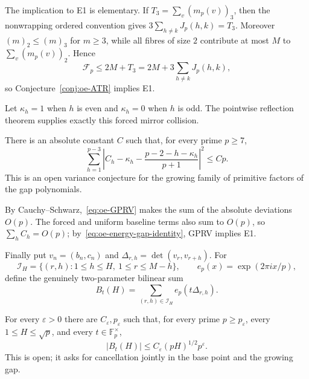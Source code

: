 The implication to E1 is elementary.  If
$T_3=\sum_v(m_p(v))_3$, then the nonwrapping ordered convention gives
$3\sum_{h\ne k}J_p(h,k)=T_3$.  Moreover
$(m)_2\le(m)_3$ for $m\ge3$, while all fibres of size $2$ contribute at
most $M$ to $\sum_v(m_p(v))_2$.  Hence
\begin{equation}\label{eq:oe-ATR-implication}
 \mathcal F_p\le2M+T_3
 =2M+3\sum_{h\ne k}J_p(h,k),
\end{equation}
so Conjecture~\ref{conj:oe-ATR} implies E1.

Let $\kappa_h=1$ when $h$ is even and $\kappa_h=0$ when $h$ is odd.  The
pointwise reflection theorem supplies exactly this forced mirror collision.

\begin{conjecture}
\label{conj:oe-GPRV}
There is an absolute constant $C$ such that, for every prime $p\ge7$,
\begin{equation}\label{eq:oe-GPRV}
 \sum_{h=1}^{p-3}
 \left|C_h-\kappa_h-
 \frac{p-2-h-\kappa_h}{p+1}\right|^2\le Cp.
\end{equation}
This is an open variance conjecture for the growing family of primitive
factors of the gap polynomials.
\end{conjecture}

By Cauchy--Schwarz,~\eqref{eq:oe-GPRV} makes the sum of the absolute
deviations $O(p)$.  The forced and uniform baseline terms also sum to
$O(p)$, so $\sum_hC_h=O(p)$; by~\eqref{eq:oe-energy-gap-identity}, GPRV
implies E1.

Finally put $v_n=(b_n,c_n)$ and
$\Delta_{r,h}=\det(v_r,v_{r+h})$.  For
\[
 \mathcal I_H=\{(r,h):1\le h\le H,\ 1\le r\le M-h\},
 \qquad e_p(x)=\exp(2\pi i x/p),
\]
define the genuinely two-parameter bilinear sum
\[
 B_t(H)=\sum_{(r,h)\in\mathcal I_H}e_p(t\Delta_{r,h}).
\]

\begin{conjecture}\label{conj:oe-2D-sqrt}
For every $\varepsilon>0$ there are $C_\varepsilon,p_\varepsilon$ such that,
for every prime $p\ge p_\varepsilon$, every $1\le H\le\sqrt p$, and every
$t\in\mathbb F_p^\times$,
\begin{equation}\label{eq:oe-2D-sqrt}
 |B_t(H)|\le C_\varepsilon(pH)^{1/2}p^\varepsilon.
\end{equation}
This is open; it asks for cancellation jointly in the base point and the
growing gap.
\end{conjecture}

